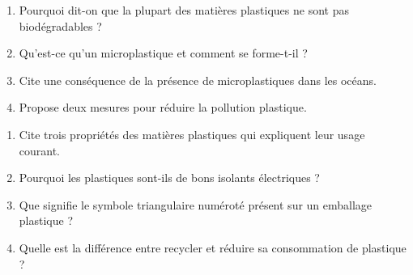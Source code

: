 \begin{enumerate}[label=\arabic*)]
\item Pourquoi dit-on que la plupart des matières plastiques ne sont pas
biodégradables ?
\item Qu'est-ce qu'un microplastique et comment se forme-t-il ?
\item Cite une conséquence de la présence de microplastiques dans les océans.
\item Propose deux mesures pour réduire la pollution plastique.
\end{enumerate}

\begin{enumerate}[label=\arabic*)]
\item Cite trois propriétés des matières plastiques qui expliquent leur usage courant.
\item Pourquoi les plastiques sont-ils de bons isolants électriques ?
\item Que signifie le symbole triangulaire numéroté présent sur un emballage plastique ?
\item Quelle est la différence entre recycler et réduire sa consommation de plastique ?
\end{enumerate}

